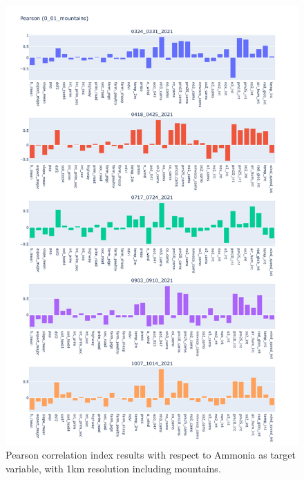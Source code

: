 \begin{figure}[H]
    \centering
    \includegraphics[scale=0.35]{images/tests/0_01_mountainsnh3_st_pearson.png}
    \caption{Pearson correlation index results with respect to Ammonia as target variable, with 1km resolution including mountains.}
    \label{fig:overview}
\end{figure}
